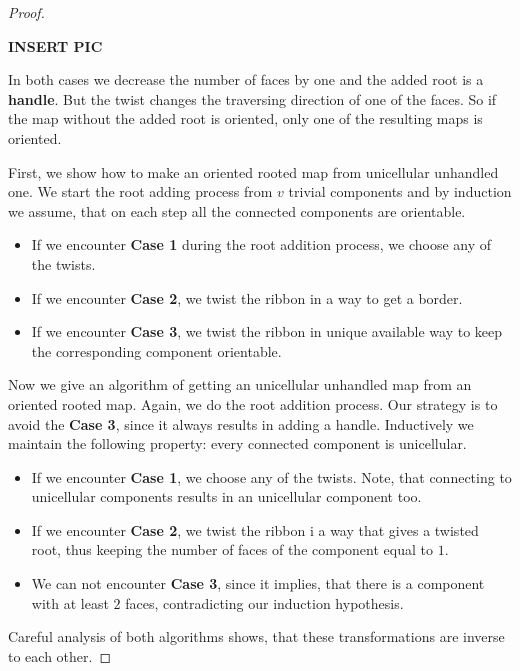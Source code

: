 \documentclass{article}
\begin{document}
\begin{proof}
\begin{itemize}
		\textbf{INSERT PIC}
		
		In both cases we decrease the number of faces by one and the added root is a \textbf{handle}. But the twist changes the traversing direction of one of the faces. So if the map without the added root is oriented, only one of the resulting maps is oriented.
	\end{itemize}

	First, we show how to make an oriented rooted map from unicellular unhandled one. We start the root adding process from $v$ trivial components and by induction we assume, that on each step all the connected components are orientable.
	\begin{itemize}
		\item If we encounter \textbf{Case 1} during the root addition process, we choose any of the twists.
		
		\item If we encounter \textbf{Case 2}, we twist the ribbon in a way to get a border.
		
		\item If we encounter \textbf{Case 3}, we twist the ribbon in unique available way to keep the corresponding component orientable. 
	\end{itemize}

	Now we give an algorithm of getting an unicellular unhandled map from an oriented rooted map. Again, we do the root addition process. Our strategy is to avoid the \textbf{Case 3}, since it always results in adding a handle. Inductively we maintain the following property: every connected component is unicellular.
	
	\begin{itemize}
		\item If we encounter \textbf{Case 1}, we choose any of the twists. Note, that connecting to unicellular components results in an unicellular component too.
		
		\item If we encounter \textbf{Case 2}, we twist the ribbon i a way that gives a twisted root, thus keeping the number of faces of the component equal to $1$.
		
		\item We can not encounter \textbf{Case 3}, since it implies, that there is a component with at least $2$ faces, contradicting our induction hypothesis.
	\end{itemize}

	Careful analysis of both algorithms shows, that these transformations are inverse to each other.
\end{proof}
\end{document}
